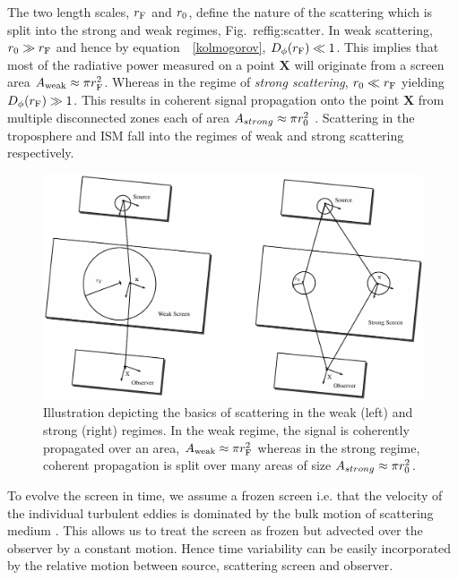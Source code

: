 The two length scales, $r_{\rm F}$ and $r_{\rm 0}$, define the nature of the scattering which is split into the strong and weak regimes, Fig.~ref{fig:scatter}. In weak scattering, $ r_{\rm 0} \gg r_{\rm F}$ and hence by equation\ ~\ref{kolmogorov}, $D_{\phi}(r_{\rm F}) \ll 1$. This implies that most of the radiative power measured on a point $\mathbf{X}$ will originate from a screen area $A_{\rm weak} \approx \pi r_{\rm F}^2$. Whereas in the regime of \emph{strong scattering}, $ r_{\rm 0} \ll r_{\rm F}$ yielding  $D_{\phi}(r_{\rm F}) \gg 1$. This  results in coherent signal propagation onto the point $\mathbf{X}$ from multiple disconnected zones each of area $A_{strong} \approx \pi r_{\rm 0}^2$ \citep{Narayan_1992}. Scattering in the troposphere and ISM fall into the regimes of weak and strong scattering respectively.

\begin{figure}
\begin{center}
\includegraphics[width=1.\columnwidth]{Images/scatter.pdf}
\caption{Illustration depicting the basics of scattering in the weak (left) and strong (right) regimes. In the weak regime, the signal is coherently propagated over an area, $A_{\rm weak} \approx \pi r_{\rm F}^2$ whereas in the strong regime, coherent propagation is split over many areas of size $A_{strong} \approx \pi r_{\rm 0}^2$. \label{fig:scatter}
}
\end{center}
\end{figure}

To evolve the screen in time, we assume a frozen screen i.e. that the velocity of the individual turbulent eddies is dominated by the bulk motion of scattering medium \citep[e.g.][]{Lay_1997}. This allows us to treat the screen as frozen but advected over the observer by a constant motion. Hence time variability can be easily incorporated by the relative motion between source, scattering screen and observer.

